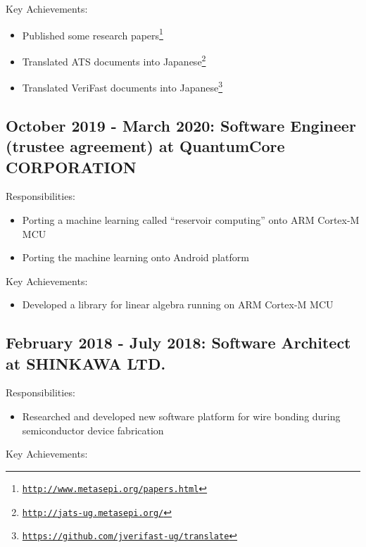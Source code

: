 \documentclass[letterpaper]{article}
\begin{document}
\noindent Key Achievements:

\begin{itemize}
  \item Published some research papers\footnote{\href{http://www.metasepi.org/papers.html}{\tt http://www.metasepi.org/papers.html}}
  \item Translated ATS documents into Japanese\footnote{\href{http://jats-ug.metasepi.org/}{\tt http://jats-ug.metasepi.org/}}
  \item Translated VeriFast documents into Japanese\footnote{\href{https://github.com/jverifast-ug/translate}{\tt https://github.com/jverifast-ug/translate}}
\end{itemize}

\subsection*{October 2019 - March 2020: Software Engineer (trustee agreement) at QuantumCore CORPORATION}

\noindent Responsibilities:

\begin{itemize}
  \item Porting a machine learning called ``reservoir computing'' onto ARM Cortex-M MCU
  \item Porting the machine learning onto Android platform
\end{itemize}

\noindent Key Achievements:

\begin{itemize}
  \item Developed a library for linear algebra running on ARM Cortex-M MCU
\end{itemize}

\subsection*{February 2018 - July 2018: Software Architect at SHINKAWA LTD.}

\noindent Responsibilities:

\begin{itemize}
  \item Researched and developed new software platform for wire bonding during semiconductor device fabrication
\end{itemize}

\noindent Key Achievements:
\end{document}
